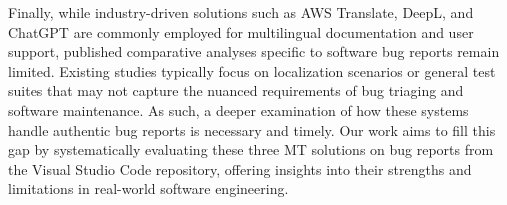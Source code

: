 Finally, while industry-driven solutions such as AWS Translate, DeepL, and ChatGPT are commonly employed for multilingual documentation and user support, published comparative analyses specific to software bug reports remain limited. Existing studies typically focus on localization scenarios or general test suites that may not capture the nuanced requirements of bug triaging and software maintenance. As such, a deeper examination of how these systems handle authentic bug reports is necessary and timely. Our work aims to fill this gap by systematically evaluating these three MT solutions on bug reports from the Visual Studio Code repository, offering insights into their strengths and limitations in real-world software engineering.